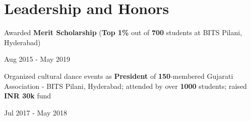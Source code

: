\documentclass[]{Keval-resume}
\begin{document}
\section{Leadership and Honors} 
\hrulefill
\postsectionsep 

\begin{minipage}[t]{.78\textwidth}
	\textbullet{} Awarded \textbf{Merit Scholarship} (\textbf{Top 1\%} out of \textbf{700} students at BITS Pilani, Hyderabad)
\end{minipage}%
\begin{minipage}[t]{.22\textwidth}
	\hfill Aug 2015 - May 2019
\end{minipage}

\begin{minipage}[t]{.78\textwidth}
	\textbullet{} Organized cultural dance events as \textbf{President} of \textbf{150}-membered Gujarati Association - BITS Pilani, Hyderabad; attended by over \textbf{1000} students; raised \textbf{INR 30k} fund
\end{minipage}%
\begin{minipage}[t]{.22\textwidth}
	\hfill Jul 2017 - May 2018
\end{minipage}


\end{document}
